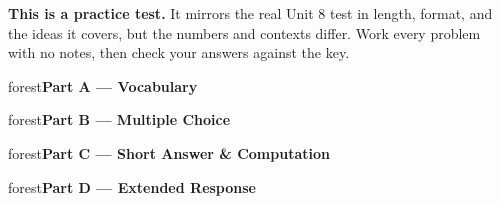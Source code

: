 \documentclass[10pt]{article}
\newcommand{\parthead}[1]{%
  \vspace{6pt}\noindent
  \begin{headlinebox}{forest}\color{white}\bfseries #1\end{headlinebox}%
  \vspace{4pt}}
\begin{document}
\namedateperiod

\vspace{0.10in}
\begin{remindbox}
\small
\textbf{This is a practice test.} It mirrors the real Unit 8 test in length, format,
and the ideas it covers, but the numbers and contexts differ. Work every problem
with no notes, then check your answers against the key.
\end{remindbox}

\parthead{Part A --- Vocabulary}

\parthead{Part B --- Multiple Choice}

\parthead{Part C --- Short Answer \& Computation}

\parthead{Part D --- Extended Response}
\end{document}
